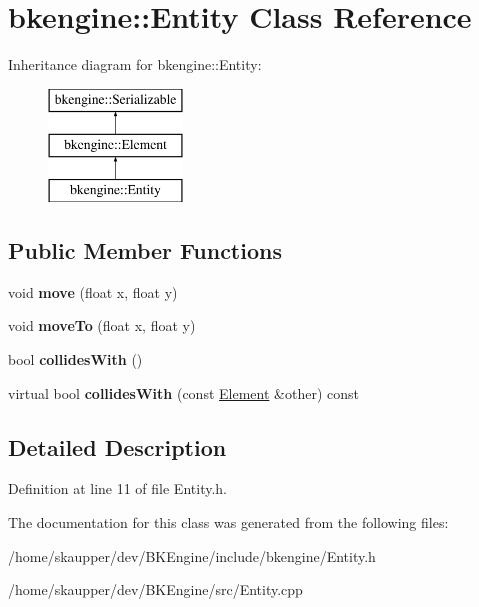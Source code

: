 \hypertarget{classbkengine_1_1Entity}{}\section{bkengine\+:\+:Entity Class Reference}
\label{classbkengine_1_1Entity}
Inheritance diagram for bkengine\+:\+:Entity\+:\begin{figure}[H]
\begin{center}
\leavevmode
\includegraphics[height=3.000000cm]{classbkengine_1_1Entity}
\end{center}
\end{figure}
\subsection*{Public Member Functions}
\begin{DoxyCompactItemize}
\item 
\mbox{\label{classbkengine_1_1Entity_a18c1a6a4603097391f9e64fd0494fd3a}} 
void {\bfseries move} (float x, float y)
\item 
\mbox{\label{classbkengine_1_1Entity_a86f9bb9793c9eb5b51bbddbd5d00f1f7}} 
void {\bfseries move\+To} (float x, float y)
\item 
\mbox{\label{classbkengine_1_1Entity_ada24ed7c2cda7f426493b053e61c7aad}} 
bool {\bfseries collides\+With} ()
\item 
\mbox{\label{classbkengine_1_1Entity_a0865cb6987b1c269cfeeef8e83156052}} 
virtual bool {\bfseries collides\+With} (const \hyperlink{classbkengine_1_1Element}{Element} \&other) const
\end{DoxyCompactItemize}


\subsection{Detailed Description}


Definition at line 11 of file Entity.\+h.



The documentation for this class was generated from the following files\+:\begin{DoxyCompactItemize}
\item 
/home/skaupper/dev/\+B\+K\+Engine/include/bkengine/Entity.\+h\item 
/home/skaupper/dev/\+B\+K\+Engine/src/Entity.\+cpp\end{DoxyCompactItemize}
